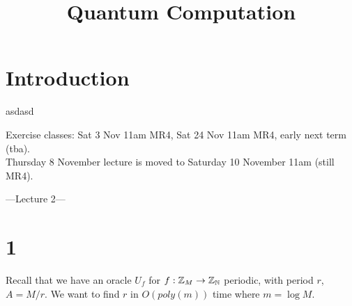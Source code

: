 \documentclass[a4paper]{article}
\begin{document}
\title{Quantum Computation}

\maketitle

\newpage

\tableofcontents

\newpage

\section{Introduction}
asdasd

\newpage

Exercise classes: Sat 3 Nov 11am MR4, Sat 24 Nov 11am MR4, early next term (tba).\\
Thursday 8 November lecture is moved to Saturday 10 November 11am (still MR4).

---Lecture 2---

\section{1}

Recall that we have an oracle $U_f$ for $f:\mathbb{Z}_M \to \mathbb{Z}_{\mathbb{N}}$ periodic, with period $r$, $A=M/r$. We want to find $r$ in $O(poly(m))$ time where $m=\log M$.
\end{document}
